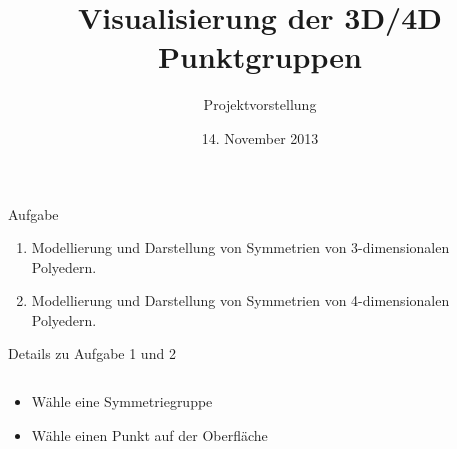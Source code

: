 \documentclass[ucs,11pt]{beamer}
\title[Punktgruppen]{Visualisierung der 3D/4D Punktgruppen}
\subtitle{Projektvorstellung}
\institute[FU Berlin]{Freie Universität Berlin}
\date[14.11.2013]{14. November 2013}
\begin{document}
\begin{frame}[plain]
	\titlepage
\end{frame}

\begin{frame}{Aufgabe}
	\begin{enumerate}
	\item Modellierung und Darstellung von Symmetrien von 3-dimensionalen Polyedern. 
	\item Modellierung und Darstellung von Symmetrien von 4-dimensionalen Polyedern. 
	\end{enumerate}
\end{frame}


\begin{frame}{Details zu Aufgabe 1 und 2}

\begin{columns}
\begin{column}{.48\textwidth}
\begin{itemize}
	\item Wähle eine Symmetriegruppe
	\item Wähle einen Punkt auf der Oberfläche
	\end{itemize}


\end{column}
\end{columns}
\end{frame}
\end{document}
